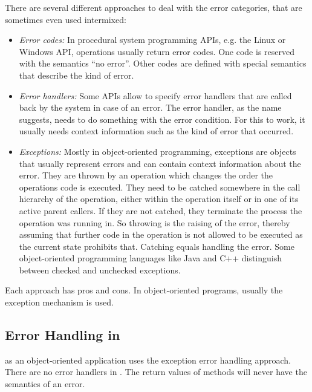 There are several different approaches to deal with the error categories, that are sometimes even used intermixed:
\begin{itemize}
\item \emph{Error codes:} In procedural system programming APIs, e.g. the Linux or Windows API, operations usually return error codes. One code is reserved with the semantics "`no error"'. Other codes are defined with special semantics that describe the kind of error.
\item \emph{Error handlers:} Some APIs allow to specify error handlers that are called back by the system in case of an error. The error handler, as the name suggests, needs to do something with the error condition. For this to work, it usually needs context information such as the kind of error that occurred.
\item \emph{Exceptions:} Mostly in object-oriented programming, exceptions are objects that usually represent errors and can contain context information about the error. They are thrown by an operation which changes the order the operations code is executed. They need to be catched somewhere in the call hierarchy of the operation, either within the operation itself or in one of its active parent callers. If they are not catched, they terminate the process the operation was running in. So throwing is the raising of the error, thereby assuming that further code in the operation is not allowed to be executed as the current state prohibits that. Catching equals handling the error. Some object-oriented programming languages like Java and C++ distinguish between checked and unchecked exceptions.
\end{itemize}

Each approach has pros and cons. In object-oriented programs, usually the exception mechanism is used.


\subsection{Error Handling in \LibName{}}
\label{sec:ErrorHandlingLibName}

\LibName{} as an object-oriented application uses the exception error handling approach. There are no error handlers in \LibName{}. The return values of \LibName{} methods will never have the semantics of an error.


